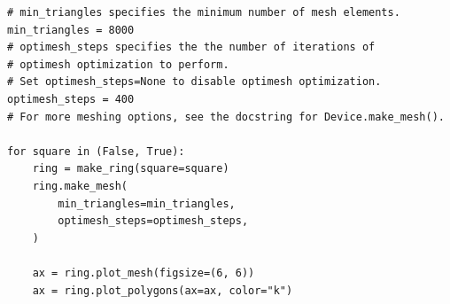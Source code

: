 \documentclass[preprint,12pt]{elsarticle}
\newenvironment{code}{\captionsetup{type=listing}}{}
\begin{document}
\begin{code}
\begin{verbatim}
# min_triangles specifies the minimum number of mesh elements.
min_triangles = 8000
# optimesh_steps specifies the the number of iterations of
# optimesh optimization to perform.
# Set optimesh_steps=None to disable optimesh optimization.
optimesh_steps = 400
# For more meshing options, see the docstring for Device.make_mesh().

for square in (False, True):
    ring = make_ring(square=square)
    ring.make_mesh(
        min_triangles=min_triangles,
        optimesh_steps=optimesh_steps,
    )
    
    ax = ring.plot_mesh(figsize=(6, 6))
    ax = ring.plot_polygons(ax=ax, color="k")
\end{verbatim}
\label{code:mesh_generation}
\end{code}
\end{document}
